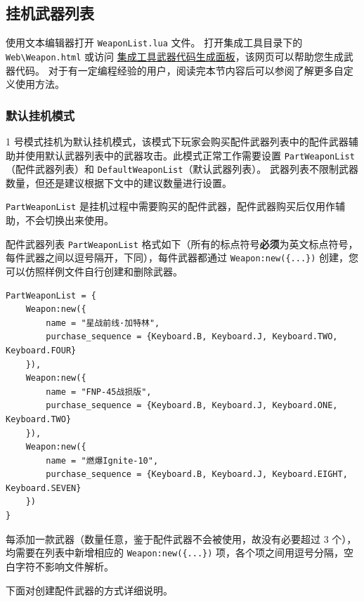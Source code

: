 \subsection{挂机武器列表}

使用文本编辑器打开 \lstinline{WeaponList.lua} 文件。
打开集成工具目录下的 \lstinline{Web\Weapon.html} 或访问 \href{https://macrohard.fun/CSOL-Utilities/Weapon.html}{集成工具武器代码生成面板}，该网页可以帮助您生成武器代码。
对于有一定编程经验的用户，阅读完本节内容后可以参阅了解更多自定义使用方法。

\subsubsection{默认挂机模式}

1 号模式挂机为默认挂机模式，该模式下玩家会购买配件武器列表中的配件武器辅助并使用默认武器列表中的武器攻击。此模式正常工作需要设置 \lstinline{PartWeaponList}（配件武器列表）和 \lstinline{DefaultWeaponList}（默认武器列表）。
武器列表不限制武器数量，但还是建议根据下文中的建议数量进行设置。

\lstinline{PartWeaponList} 是挂机过程中需要购买的配件武器，配件武器购买后仅用作辅助，不会切换出来使用。

配件武器列表 \lstinline{PartWeaponList} 格式如下（所有的标点符号\textbf{\color{red}必须}为英文标点符号，每件武器之间以逗号隔开，下同），每件武器都通过 \lstinline|Weapon:new({...})| 创建，您可以仿照样例文件自行创建和删除武器。

\begin{verbatim}
PartWeaponList = {
    Weapon:new({
        name = "星战前线·加特林",
        purchase_sequence = {Keyboard.B, Keyboard.J, Keyboard.TWO, Keyboard.FOUR}
    }),
    Weapon:new({
        name = "FNP-45战损版",
        purchase_sequence = {Keyboard.B, Keyboard.J, Keyboard.ONE, Keyboard.TWO}
    }),
    Weapon:new({
        name = "燃爆Ignite-10",
        purchase_sequence = {Keyboard.B, Keyboard.J, Keyboard.EIGHT, Keyboard.SEVEN}
    })
}
\end{verbatim}

每添加一款武器（数量任意，鉴于配件武器不会被使用，故没有必要超过 3 个），均需要在列表中新增相应的 \lstinline|Weapon:new({...})| 项，各个项之间用逗号分隔，空白字符不影响文件解析。

下面对创建配件武器的方式详细说明。

